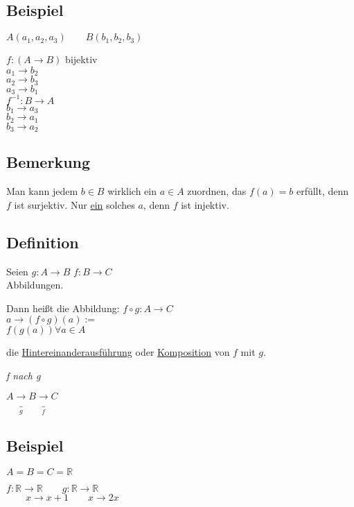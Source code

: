 \documentclass[a4paper, 12pt, twoside] {article}
\begin{document}
\subsection{Beispiel}
$A (a_1, a_2, a_3) \qquad B (b_1, b_2, b_3)$

$f \colon (A \rightarrow B)$ bijektiv \\
$a_1 \rightarrow b_2$ \\
$a_2 \rightarrow b_3$ \\
$a_3 \rightarrow b_1$ \\

$f^{-1} \colon B \rightarrow A$ \\
$b_1 \rightarrow a_3$ \\
$b_2 \rightarrow a_1$ \\
$b_3 \rightarrow a_2$ \\

\subsection{Bemerkung}
Man kann jedem $b \in B$ wirklich ein $a \in A$ zuordnen, das $f(a) = b$ erfüllt, denn $f$ ist surjektiv. Nur \underline{ein} solches $a$, denn $f$ ist injektiv.

\subsection{Definition}
Seien $g \colon A \rightarrow B$ \qquad $f \colon B \rightarrow C$ \\
Abbildungen.

Dann heißt die Abbildung:
$f \circ g \colon A \rightarrow C$ \\
$a \rightarrow (f \circ g) (a):=$ \\
$f(g(a)) \forall a \in A$

die \underline{Hintereinanderausführung} oder \underline{Komposition} von $f$ mit $g$.

\textit{f nach g}

$A \underbrace{\rightarrow}_{g} B \underbrace{\rightarrow}_{f} C$ %

\subsection{Beispiel}
$A = B = C = \mathbb{R}$

$f \colon \mathbb{R} \rightarrow \mathbb{R} \qquad g \colon \mathbb{R} \rightarrow \mathbb{R}$ \\
$\qquad x \rightarrow x + 1 \qquad x \rightarrow 2x$
\end{document}
